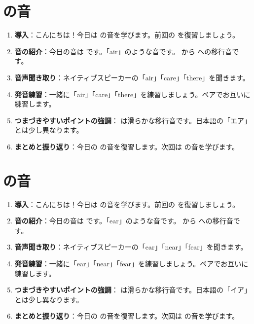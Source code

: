 \documentclass[book,jafontscale=0.9247]{jlreq}
\begin{document}
\section{ の音}
\begin{enumerate}
    \item \textbf{導入}：こんにちは！今日は  の音を学びます。前回の  を復習しましょう。
    \item \textbf{音の紹介}：今日の音は  です。「air」のような音です。  から  への移行音です。
    \item \textbf{音声聞き取り}：ネイティブスピーカーの「air」「care」「there」を聞きます。
    \item \textbf{発音練習}：一緒に「air」「care」「there」を練習しましょう。ペアでお互いに練習します。
    \item \textbf{つまづきやすいポイントの強調}：  は滑らかな移行音です。日本語の「エア」とは少し異なります。
    \item \textbf{まとめと振り返り}：今日の  の音を復習します。次回は  の音を学びます。
\end{enumerate}

\section{ の音}
\begin{enumerate}
    \item \textbf{導入}：こんにちは！今日は  の音を学びます。前回の  を復習しましょう。
    \item \textbf{音の紹介}：今日の音は  です。「ear」のような音です。  から \textipa{/\textschwa /} への移行音です。
    \item \textbf{音声聞き取り}：ネイティブスピーカーの「ear」「near」「fear」を聞きます。
    \item \textbf{発音練習}：一緒に「ear」「near」「fear」を練習しましょう。ペアでお互いに練習します。
    \item \textbf{つまづきやすいポイントの強調}：  は滑らかな移行音です。日本語の「イア」とは少し異なります。
    \item \textbf{まとめと振り返り}：今日の  の音を復習します。次回は  の音を学びます。
\end{enumerate}
\end{document}
